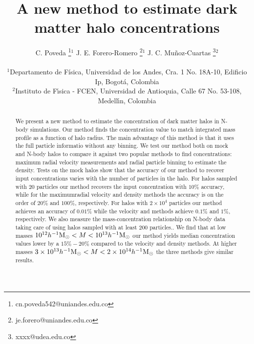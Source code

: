 \documentclass[a4,useAMS,usenatbib,usegraphicx]{mn2e}
\newcommand{\hMsun}{{\ifmmode{h^{-1}{\rm {M_{\odot}}}}\else{$h^{-1}{\rm{M_{\odot}}}$}\fi}}
\begin{document}
\title{A new method to estimate dark matter halo concentrations}
\author[C. Poveda, J.E. Forero-Romero, J.C. Mu\~noz-Cuartas]{
\parbox[t]{\textwidth}{\raggedright 
  C. Poveda \thanks{cn.poveda542@uniandes.edu.co}$^{1}$
  J. E. Forero-Romero \thanks{je.forero@uniandes.edu.co}$^{1}$
  J. C. Mu\~noz-Cuartas \thanks{xxxx@udea.edu.co}$^{2}$
}
\vspace*{6pt}\\
$^1$Departamento de F\'{i}sica, Universidad de los Andes, Cra. 1
No. 18A-10, Edificio Ip, Bogot\'a, Colombia\\
$^2$Instituto de F\'{\i}sica - FCEN, Universidad de Antioquia, Calle
67 No. 53-108, Medell\'{\i}n, Colombia
}

\maketitle

\begin{abstract}

We present a new method to estimate the concentration of dark matter
halos in N-body simulations.
Our method finds the concentration value to match integrated mass profile as a function of
halo radius.
The main advantage of this method is that it uses the full particle informatio
without any binning.
We test our method both on mock and N-body halos to compare it against
two popular methods to find concentrations: maximum radial velocity
measurements and radial particle binning to estimate the density.
Tests on the mock halos show that the accuracy of our method to
recover input concentrations varies with the number of particles in
the halo. 
For halos sampled with $20$ particles our method recovers the input
concentration with $10\%$ accuracy, while for the maximumradial
velocity and density methods the accuracy is on the order of $20\%$
and $100\%$, respectively.  
For halos with $2\times 10^4$ particles our method achieves an accuracy of
$0.01\%$ while the velocity and  methods achieve $0.1\%$ and $1\%$,
respectively.  
We also measure the mass-concentration relationship on N-body data
taking care of using halos sampled with at least $200$ particles..
We find that at low masses $10^{12}\hMsun < M<10^{13}\hMsun$ our
method yields median concentration values lower by a $15\%-20\%$
compared to the velocity and density methods. 
At higher masses $3\times 10^{13}\hMsun < M < 2\times 10^{14}\hMsun$ the
three methods give similar results.
\end{abstract}
\end{document}
